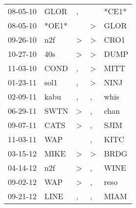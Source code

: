 \begin{supertabular}{p{0.07\textwidth}p{0.06\textwidth}p{0.02\textwidth}p{0.02\textwidth}p{0.06\textwidth}}
          08-05-10\textsuperscript{} &           GLOR\textsuperscript{} &                , &                  &                            *CE1* \\
          08-05-10\textsuperscript{} &                            *OE1* &                  &     \textgreater &           GLOR\textsuperscript{} \\
          09-26-10\textsuperscript{} &            n2f\textsuperscript{} &     \textgreater &     \textgreater &           CRO1\textsuperscript{} \\
          10-27-10\textsuperscript{} &            40s\textsuperscript{} &     \textgreater &     \textgreater &           DUMP\textsuperscript{} \\
          11-03-10\textsuperscript{} &           COND\textsuperscript{} &                , &     \textgreater &           MITT\textsuperscript{} \\
          01-23-11\textsuperscript{} &           sol1\textsuperscript{} &                , &     \textgreater &           NINJ\textsuperscript{} \\
          02-09-11\textsuperscript{} &           kabu\textsuperscript{} &                , &                , &           whis\textsuperscript{} \\
          06-29-11\textsuperscript{} &           SWTN\textsuperscript{} &     \textgreater &                , &           chan\textsuperscript{} \\
          09-07-11\textsuperscript{} &           CATS\textsuperscript{} &     \textgreater &                , &           SJIM\textsuperscript{} \\
          11-03-11\textsuperscript{} &            WAP\textsuperscript{} &                  &                , &           KITC\textsuperscript{} \\
          03-15-12\textsuperscript{} &           MIKE\textsuperscript{} &     \textgreater &     \textgreater &           BRDG\textsuperscript{} \\
          04-14-12\textsuperscript{} &            n2f\textsuperscript{} &     \textgreater &                , &           WINE\textsuperscript{} \\
          09-02-12\textsuperscript{} &            WAP\textsuperscript{} &     \textgreater &                , &           reso\textsuperscript{} \\
          09-21-12\textsuperscript{} &           LINE\textsuperscript{} &                , &                , &           MIAM\textsuperscript{} \\

\end{supertabular}
